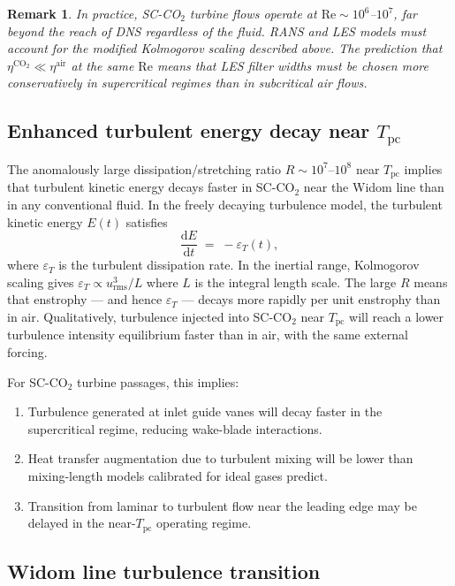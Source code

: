 \documentclass[12pt,a4paper]{article}
\newtheorem{remark}[theorem]{Remark}
\newcommand{\eps}{\varepsilon}
\newcommand{\Tc}{T_{\mathrm{pc}}}   %
\newcommand{\sco}{SC-CO$_2$}
\newcommand{\Rey}{\mathrm{Re}}
\newcommand{\Kol}{\eta}             %
\begin{document}
\begin{remark}
  In practice, \sco{} turbine flows operate at $\Rey \sim 10^6$--$10^7$, far
  beyond the reach of DNS regardless of the fluid.  RANS and LES models must
  account for the modified Kolmogorov scaling described above.  The prediction
  that $\Kol^{\mathrm{CO_2}} \ll \Kol^{\mathrm{air}}$ at the same $\Rey$ means
  that LES filter widths must be chosen more conservatively in supercritical
  regimes than in subcritical air flows.
\end{remark}

\subsection{Enhanced turbulent energy decay near $\Tc$}
\label{sec:engineering:decay}

The anomalously large dissipation/stretching ratio $R \sim 10^7$--$10^8$
near $\Tc$ implies that turbulent kinetic energy decays faster in \sco{} near
the Widom line than in any conventional fluid.  In the freely decaying
turbulence model, the turbulent kinetic energy $E(t)$ satisfies
\begin{equation}
  \frac{\mathrm{d}E}{\mathrm{d}t} \;=\; -\eps_T(t),
  \label{eq:TKE_decay}
\end{equation}
where $\eps_T$ is the turbulent dissipation rate.  In the inertial range, Kolmogorov
scaling gives $\eps_T \propto u_\mathrm{rms}^3 / L$ where $L$ is the integral
length scale.  The large $R$ means that enstrophy --- and hence $\eps_T$ --- decays
more rapidly per unit enstrophy than in air.  Qualitatively, turbulence injected
into \sco{} near $\Tc$ will reach a lower turbulence intensity equilibrium
faster than in air, with the same external forcing.

For \sco{} turbine passages, this implies:
\begin{enumerate}[label=(\roman*)]
  \item Turbulence generated at inlet guide vanes will decay faster in the
    supercritical regime, reducing wake-blade interactions.
  \item Heat transfer augmentation due to turbulent mixing will be lower
    than mixing-length models calibrated for ideal gases predict.
  \item Transition from laminar to turbulent flow near the leading edge may
    be delayed in the near-$\Tc$ operating regime.
\end{enumerate}

\subsection{Widom line turbulence transition}
\label{sec:engineering:widom_transition}
\end{document}
